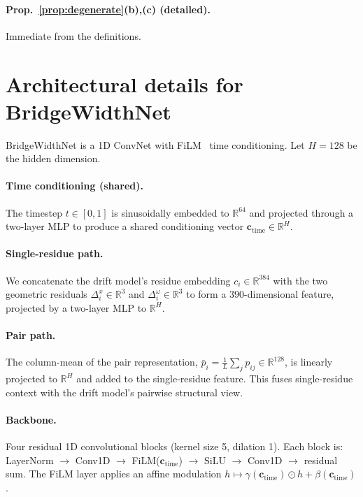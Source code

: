 \documentclass{article}
\theoremstyle{remark}
\theoremstyle{definition}
\newcommand{\R}{\mathbb{R}}
\begin{document}
\paragraph{Prop.~\ref{prop:degenerate}(b),(c) (detailed).}
Immediate from the definitions.

\section{Architectural details for BridgeWidthNet}
\label{app:arch}

BridgeWidthNet is a 1D ConvNet with FiLM~\citep{perez2018film} time
conditioning. Let $H=128$ be the hidden dimension.

\paragraph{Time conditioning (shared).}
The timestep $t\in[0,1]$ is sinusoidally embedded to $\R^{64}$ and projected
through a two-layer MLP to produce a shared conditioning vector
$\mathbf{c}_{\text{time}}\in\R^{H}$.

\paragraph{Single-residue path.}
We concatenate the drift model's residue embedding $c_i\in\R^{384}$ with the
two geometric residuals $\Delta^x_i\in\R^3$ and $\Delta^\omega_i\in\R^3$ to
form a $390$-dimensional feature, projected by a two-layer MLP to $\R^H$.

\paragraph{Pair path.}
The column-mean of the pair representation,
$\bar p_i=\tfrac{1}{L}\sum_j p_{ij}\in\R^{128}$, is linearly projected to
$\R^H$ and added to the single-residue feature. This fuses single-residue
context with the drift model's pairwise structural view.

\paragraph{Backbone.}
Four residual 1D convolutional blocks (kernel size 5, dilation 1). Each block
is: LayerNorm $\to$ Conv1D $\to$ FiLM($\mathbf{c}_{\text{time}}$) $\to$ SiLU
$\to$ Conv1D $\to$ residual sum. The FiLM layer applies an affine modulation
$h \mapsto \gamma(\mathbf{c}_{\text{time}})\odot h+\beta(\mathbf{c}_{\text{time}})$.
\end{document}
